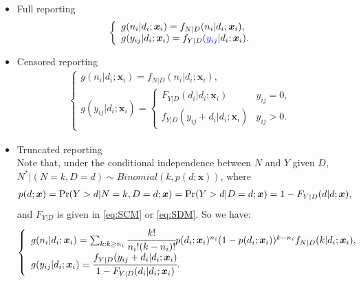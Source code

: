 \documentclass[11pt]{article}
\newcommand{\rev}[1]{{\color{blue}#1}}
\begin{document}
\begin{itemize}
        \item \rev{Full reporting}
        \begin{align} \label{eq:fr}
       	\left\{
       	\begin{array}{l}
       	g(n_i|d_i;\bm{x}_i) = f_{N|D}(n_i|d_i;\bm{x}_i), \\
	g(y_{ij}|d_i;\bm{x}_i) = f_{Y|D}(\rev{y_{ij}}|d_i;\bm{x}_i).
       	\end{array}
        \right.
       \end{align}
	\item \rev{Censored reporting}
       \begin{align} \label{eq:urc}
       	\left\{
       	\begin{array}{l}
       	g(n_i|d_i;\bm{x}_i) = f_{N|D}(n_i|d_i;\bm{x}_i), \\
	g(y_{ij}|d_i;\bm{x}_i)  = \left\{
	\begin{array}{ll}
		F_{Y|D}(d_i|d_i;\bm{x}_i) & y_{ij} = 0, \\
		f_{Y|D}(y_{ij}+d_i|d_i;\bm{x}_i) & y_{ij} > 0.
	\end{array}
	\right.
       	\end{array}
        \right.
       \end{align}
	\item \rev{Truncated reporting}\\
    Note \rev{that, under the conditional independence between $N$ and $Y$ given $D$,} $N^*|(N=k,D=d) \sim Binomial (k,p(d;\bm{x}))$, where
\begin{align*}
	p(d;\bm{x}) = {\rm Pr}(Y>d|N=k,D=d;\bm{x}) = {\rm Pr}(Y>d|D=d;\bm{x}) = 1-F_{Y|D}(d|d;\bm{x})\rev{,}
\end{align*}
\rev{and $F_{Y|D}$ is given in \eqref{eq:SCM} or \eqref{eq:SDM}.} So we have:
	       \begin{align} \label{eq:urt}
	       		\left\{
	       		\begin{array}{l}
		g(n_i|d_i;\bm{x}_i) = \sum_{k:k\ge n_i} \cfrac{k!}{n_i!(k-n_i)!} p(d_i;\bm{x}_i)^{n_i} (1-p(d_i;\bm{x}_i))^{k-n_i} f_{N|D}(k|d_i;\bm{x}_i), \\
	g(y_{ij}|d_i;\bm{x}_i)  = \cfrac{f_{Y|D}(y_{ij}+d_i|d_i;\bm{x}_i) }{1-F_{Y|D}(d_i|d_i;\bm{x}_i)}.
		\end{array}
		\right.
	\end{align}
\end{itemize}

\end{document}
